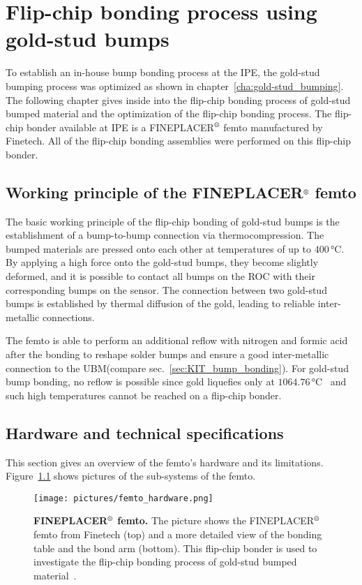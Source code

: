 \acresetall
\chapter{Flip-chip bonding process using gold-stud bumps}\label{cha:flip-chipping}
To establish an in-house bump bonding process at the \ac{IPE}, the gold-stud bumping process was optimized as shown in chapter~\ref{cha:gold-stud_bumping}. The following chapter gives inside into the flip-chip bonding process of gold-stud bumped material and the optimization of the flip-chip bonding process. The flip-chip bonder available at \ac{IPE} is a FINEPLACER$\rm{\symbR}$ femto manufactured by Finetech. All of the flip-chip bonding assemblies were performed on this flip-chip bonder. 


\section{Working principle of the FINEPLACER$\rm{\symbR}$ femto}
The basic working principle of the flip-chip bonding of gold-stud bumps is the establishment of a bump-to-bump connection via thermocompression. The bumped materials are pressed onto each other at temperatures of up to $400\,\si{\degreeCelsius}$. By applying a high force onto the gold-stud bumps, they become slightly deformed, and it is possible to contact all bumps on the \ac{ROC} with their corresponding bumps on the sensor. The connection between two gold-stud bumps is established by thermal diffusion of the gold, leading to reliable inter-metallic connections.

The femto is able to perform an additional reflow with nitrogen and formic acid after the bonding to reshape solder bumps and ensure a good inter-metallic connection to the \ac{UBM}(compare sec.~\ref{sec:KIT_bump_bonding}). For gold-stud bump bonding, no reflow is possible since gold liquefies only at $1064.76\,\si{\degreeCelsius}$~\cite{NLM14c} and such high temperatures cannot be reached on a flip-chip bonder.

\section{Hardware and technical specifications}
This section gives an overview of the femto's hardware and its limitations. Figure~\ref{pic:femto} shows pictures of the sub-systems of the femto.
\begin{figure}
\begin{center}
\texttt{[image: pictures/femto\_hardware.png]}
\end{center}
\caption[FINEPLACER$\rm{\symbR}$ femto]{\textbf{FINEPLACER$\rm{\symbR}$ femto.} The picture shows the FINEPLACER$\rm{\symbR}$ femto from Finetech (top) and a more detailed view of the bonding table and the bond arm (bottom). This flip-chip bonder is used to investigate the flip-chip bonding process of gold-stud bumped material~\cite{Fin14a}.}\label{pic:femto}
\end{figure}

